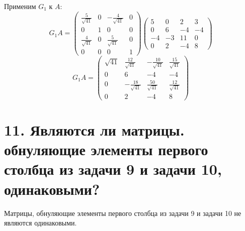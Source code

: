 \documentclass[a4paper,14pt]{article}
\begin{document}
   Применим \( G_1 \) к \( A \):
   \[
   G_1 A = \begin{pmatrix}
   \frac{5}{\sqrt{41}} & 0 & -\frac{4}{\sqrt{41}} & 0 \\
   0 & 1 & 0 & 0 \\
   \frac{4}{\sqrt{41}} & 0 & \frac{5}{\sqrt{41}} & 0 \\
   0 & 0 & 0 & 1
   \end{pmatrix}
   \begin{pmatrix}
   5 & 0 & 2 & 3 \\
   0 & 6 & -4 & -4 \\
   -4 & -3 & 11 & 0 \\
   0 & 2 & -4 & 8
   \end{pmatrix}
   \]
   \[
   G_1 A = \begin{pmatrix}
   \sqrt{41} & \frac{12}{\sqrt{41}} & -\frac{10}{\sqrt{41}} & \frac{15}{\sqrt{41}} \\
   0 & 6 & -4 & -4 \\
   0 & -\frac{18}{\sqrt{41}} & \frac{50}{\sqrt{41}} & \frac{12}{\sqrt{41}} \\
   0 & 2 & -4 & 8
   \end{pmatrix}
   \]



\section{11. Являются ли матрицы. обнуляющие элементы первого столбца из задачи 9 и задачи 10, одинаковыми?}

Матрицы, обнуляющие элементы первого столбца из задачи 9 и задачи 10 не являются одинаковыми.
\end{document}
